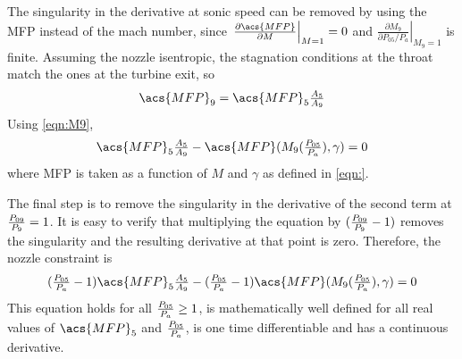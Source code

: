 \documentclass[tcc]{subfiles}
\begin{document}
The singularity in the derivative at sonic speed can be removed by using the \ac{MFP} instead of the mach number, since 
$\left.\frac{\partial\acs{MFP}}{\partial M} \right|_{M=1} = 0$ 
and 
$\left.\frac{\partial M_9}{\partial P_{05}/P_a}\right|_{M_9=1}$ is finite.
 Assuming the nozzle isentropic, the stagnation conditions at the throat match the ones at the turbine exit, so
\begin{equation}
    \acs{MFP}_9 = \acs{MFP}_5 \tfrac{A_5}{A_9}
\end{equation}
Using \cref{eqn:M9},
\begin{equation}
    \textstyle
    \acs{MFP}_5 \tfrac{A_5}{A_9} - \acs{MFP}(M_9(\pr{05}{a}), \gamma) = 0
\end{equation}
where \acs{MFP} is taken as a function of $M$ and $\gamma$ as defined in \cref{eqn:}.

The final step is to remove the singularity in the derivative of the second term at $\frac{P_{09}}{P_{9}} = 1$. 
It is easy to verify that multiplying the equation by $(\frac{P_{09}}{P_{9}}-1)$ removes the singularity and the resulting derivative at that point is zero. 
Therefore, the nozzle constraint is
\begin{equation}
    \textstyle
    (\pr{05}{a}-1)\acs{MFP}_5\frac{A_5}{A_9} - (\pr{05}{a}-1)\acs{MFP}(M_9(\pr{05}{a}), \gamma) = 0
\end{equation}
This equation holds for all $\frac{P_{05}}{P_{a}} \geq 1$, is mathematically well defined for all real values of $\acs{MFP}_5$ and $\frac{P_{05}}{P_{a}}$, is one time differentiable and has a continuous derivative.
\end{document}
